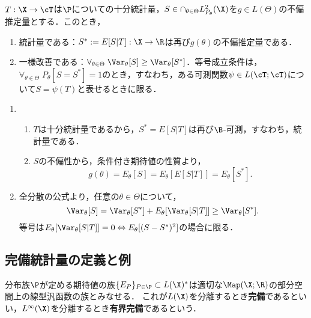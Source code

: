 \documentclass[uplatex,dvipdfmx]{jsreport}
\begin{document}
\begin{proposition}
    $T:\X\to\cT$は$\P$についての十分統計量，$S\in \cap_{\theta\in\Theta}L^2_{P_\theta}(\X)$を$g\in L(\Theta)$の不偏推定量とする．このとき，
    \begin{enumerate}
        \item 統計量である：$S^*:=E[S|T]:\X\to\R$は再び$g(\theta)$の不偏推定量である．
        \item 一様改善である：$\forall_{\theta\in\Theta}\;\Var_\theta[S]\ge\Var_\theta[S^*]$．等号成立条件は，$\forall_{\theta\in\Theta}\;P_\theta[S=S^*]=1$のとき，すなわち，ある可測関数$\psi\in L(\cT;\cT)$について$S=\psi(T)$と表せるときに限る．
    \end{enumerate}
\end{proposition}
\begin{Proof}\mbox{}
    \begin{enumerate}
        \item \begin{enumerate}
            \item $T$は十分統計量であるから，$S^*=E[S|T]$は再び$\B$-可測，すなわち，統計量である．
            \item $S$の不偏性から，条件付き期待値の性質より，
            \[g(\theta)=E_\theta[S]=E_\theta[E[S|T]]=E_\theta[S^*].\]
        \end{enumerate}
        \item 全分散の公式より，任意の$\theta\in\Theta$について，
        \[\Var_\theta[S]=\Var_\theta[S^*]+E_\theta[\Var_\theta[S|T]]\ge\Var_\theta[S^*].\]
        等号は$E_\theta[\Var_\theta[S|T]]=0\Leftrightarrow E_\theta[(S-S^*)^2]$の場合に限る．
    \end{enumerate}
\end{Proof}

\subsection{完備統計量の定義と例}

\begin{tcolorbox}[colframe=ForestGreen, colback=ForestGreen!10!white,breakable,colbacktitle=ForestGreen!40!white,coltitle=black,fonttitle=\bfseries\sffamily,
title=]
    分布族$\P$が定める期待値の族$\{E_P\}_{P\in\P}\subset L(\X)^*$は適切な$\Map(\X;\R)$の部分空間上の線型汎函数の族とみなせる．
    これが$L(\X)$を分離するとき\textbf{完備}であるといい，$L^\infty(\X)$を分離するとき\textbf{有界完備}であるという．
\end{tcolorbox}
\end{document}

